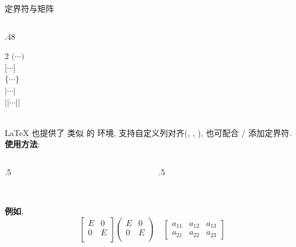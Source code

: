\begin{frame}{定界符与矩阵}
\begin{columns}[T, onlytextwidth]
\begin{column}{.48\columnwidth}
\begin{multicols}{2}
				 \hfill $\big(\cdots\big)$\\[.5ex]
				 \hfill $\big[\cdots\big]$\\[.5ex]
				 \hfill $\bigl\{\cdots\bigr\}$\\[.5ex]
				 \hfill $|\cdots|$\\[.5ex]
				 \hfill $||\cdots||$\\~\\
			\end{multicols}\vspace*{-2ex}
			\LaTeX{} 也提供了 类似  的  环境, 支持自定义列对齐(, , ), 也可配合 / 添加定界符.\\[1ex]
			\textbf{使用方法}: \\[1ex]
			\begin{columns}[onlytextwidth]
				\begin{column}{.5\textwidth}
					\\
					\hspace*{1em}\\
				\end{column}
				\begin{column}{.5\textwidth}
					\\
					\hspace*{1em}\\
				\end{column}
			\end{columns}\vspace*{1ex}
			\textbf{例如},\vspace*{-1ex}
			\[
			\begin{bmatrix}
				E & 0 \\
				0 & E \\
			\end{bmatrix}
			\begin{pmatrix}
				E & 0 \\
				0 & E \\
			\end{pmatrix}
			\quad
			\left[\begin{array}{ccc}
			a_{11} & a_{12} & a_{13} \\
			a_{21} & a_{22} & a_{23}
			\end{array}\right]
			\]
		\end{column}
	\end{columns}
\end{frame}

